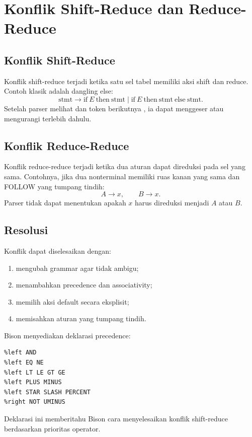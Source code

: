 \section{Konflik Shift-Reduce dan Reduce-Reduce}
\label{sec:ch12-konflik}

\subsection{Konflik Shift-Reduce}

Konflik shift-reduce terjadi ketika satu sel tabel memiliki aksi
shift dan reduce. Contoh klasik adalah dangling else:
\[
\text{stmt} \to \text{if}\ E\ \text{then}\ \text{stmt}
\mid \text{if}\ E\ \text{then}\ \text{stmt}\ \text{else}\
\text{stmt}.
\]
Setelah parser melihat  dan token berikutnya
, ia dapat menggeser \code{else} atau mengurangi
 terlebih dahulu.

\subsection{Konflik Reduce-Reduce}

Konflik reduce-reduce terjadi ketika dua aturan dapat direduksi pada
sel yang sama. Contohnya, jika dua nonterminal memiliki ruas kanan
yang sama dan FOLLOW yang tumpang tindih:
\[
A \to x, \qquad B \to x.
\]
Parser tidak dapat menentukan apakah \(x\) harus direduksi menjadi
\(A\) atau \(B\).

\subsection{Resolusi}

Konflik dapat diselesaikan dengan:
\begin{enumerate}[label=\arabic*.,leftmargin=*]
  \item mengubah grammar agar tidak ambigu;
  \item menambahkan precedence dan associativity;
  \item memilih aksi default secara eksplisit;
  \item memisahkan aturan yang tumpang tindih.
\end{enumerate}

Bison menyediakan deklarasi precedence:
\begin{lstlisting}[language=Bison]
%left OR
%left AND
%left EQ NE
%left LT LE GT GE
%left PLUS MINUS
%left STAR SLASH PERCENT
%right NOT UMINUS
\end{lstlisting}
Deklarasi ini memberitahu Bison cara menyelesaikan konflik
shift-reduce berdasarkan prioritas operator.

